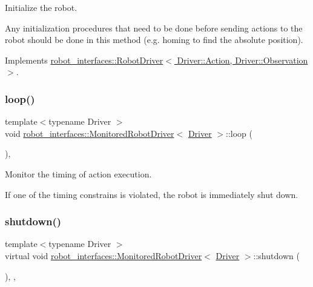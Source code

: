 Initialize the robot. 

Any initialization procedures that need to be done before sending actions to the robot should be done in this method (e.\+g. homing to find the absolute position). 

Implements \hyperlink{classrobot__interfaces_1_1RobotDriver_af3cbef570a455e1f8085d701282264ff}{robot\+\_\+interfaces\+::\+Robot\+Driver$<$ Driver\+::\+Action, Driver\+::\+Observation $>$}.

\mbox{\label{classrobot__interfaces_1_1MonitoredRobotDriver_a6ed3d940dce484dcdc558a52a8dfe8a5}} 
\subsubsection{\texorpdfstring{loop()}{loop()}}
{\footnotesize\ttfamily template$<$typename Driver $>$ \\
void \hyperlink{classrobot__interfaces_1_1MonitoredRobotDriver}{robot\+\_\+interfaces\+::\+Monitored\+Robot\+Driver}$<$ \hyperlink{classDriver}{Driver} $>$\+::loop (\begin{DoxyParamCaption}{ }\end{DoxyParamCaption})\hspace{0.3cm}{\ttfamily [inline]}, {\ttfamily [private]}}



Monitor the timing of action execution. 

If one of the timing constrains is violated, the robot is immediately shut down. \mbox{\label{classrobot__interfaces_1_1MonitoredRobotDriver_a95714a60e69a3ac06461382a7b391289}} 
\subsubsection{\texorpdfstring{shutdown()}{shutdown()}}
{\footnotesize\ttfamily template$<$typename Driver $>$ \\
virtual void \hyperlink{classrobot__interfaces_1_1MonitoredRobotDriver}{robot\+\_\+interfaces\+::\+Monitored\+Robot\+Driver}$<$ \hyperlink{classDriver}{Driver} $>$\+::shutdown (\begin{DoxyParamCaption}{ }\end{DoxyParamCaption})\hspace{0.3cm}{\ttfamily [inline]}, {\ttfamily [final]}, {\ttfamily [virtual]}}



